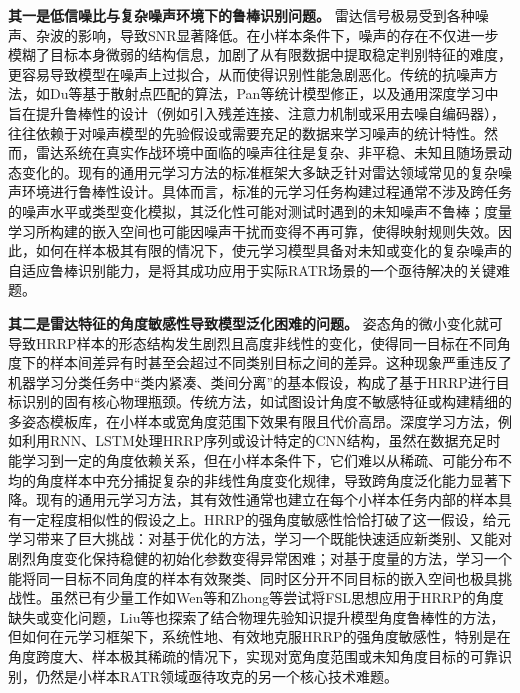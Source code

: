 \textbf{其一是低信噪比与复杂噪声环境下的鲁棒识别问题。}
雷达信号极易受到各种噪声、杂波的影响，导致SNR显著降低。在小样本条件下，噪声的存在不仅进一步模糊了目标本身微弱的结构信息，加剧了从有限数据中提取稳定判别特征的难度，更容易导致模型在噪声上过拟合，从而使得识别性能急剧恶化。传统的抗噪声方法，如Du等基于散射点匹配的算法，Pan等统计模型修正，以及通用深度学习中旨在提升鲁棒性的设计（例如引入残差连接、注意力机制或采用去噪自编码器），往往依赖于对噪声模型的先验假设或需要充足的数据来学习噪声的统计特性。然而，雷达系统在真实作战环境中面临的噪声往往是复杂、非平稳、未知且随场景动态变化的。现有的通用元学习方法的标准框架大多缺乏针对雷达领域常见的复杂噪声环境进行鲁棒性设计。具体而言，标准的元学习任务构建过程通常不涉及跨任务的噪声水平或类型变化模拟，其泛化性可能对测试时遇到的未知噪声不鲁棒；度量学习所构建的嵌入空间也可能因噪声干扰而变得不再可靠，使得映射规则失效。因此，如何在样本极其有限的情况下，使元学习模型具备对未知或变化的复杂噪声的自适应鲁棒识别能力，是将其成功应用于实际RATR场景的一个亟待解决的关键难题。

\textbf{其二是雷达特征的角度敏感性导致模型泛化困难的问题。}
姿态角的微小变化就可导致HRRP样本的形态结构发生剧烈且高度非线性的变化，使得同一目标在不同角度下的样本间差异有时甚至会超过不同类别目标之间的差异。这种现象严重违反了机器学习分类任务中“类内紧凑、类间分离”的基本假设，构成了基于HRRP进行目标识别的固有核心物理瓶颈。传统方法，如试图设计角度不敏感特征或构建精细的多姿态模板库，在小样本或宽角度范围下效果有限且代价高昂。深度学习方法，例如利用RNN、LSTM处理HRRP序列或设计特定的CNN结构，虽然在数据充足时能学习到一定的角度依赖关系，但在小样本条件下，它们难以从稀疏、可能分布不均的角度样本中充分捕捉复杂的非线性角度变化规律，导致跨角度泛化能力显著下降。现有的通用元学习方法，其有效性通常也建立在每个小样本任务内部的样本具有一定程度相似性的假设之上。HRRP的强角度敏感性恰恰打破了这一假设，给元学习带来了巨大挑战：对基于优化的方法，学习一个既能快速适应新类别、又能对剧烈角度变化保持稳健的初始化参数变得异常困难；对基于度量的方法，学习一个能将同一目标不同角度的样本有效聚类、同时区分开不同目标的嵌入空间也极具挑战性。虽然已有少量工作如Wen等和Zhong等尝试将FSL思想应用于HRRP的角度缺失或变化问题，Liu等也探索了结合物理先验知识提升模型角度鲁棒性的方法，但如何在元学习框架下，系统性地、有效地克服HRRP的强角度敏感性，特别是在角度跨度大、样本极其稀疏的情况下，实现对宽角度范围或未知角度目标的可靠识别，仍然是小样本RATR领域亟待攻克的另一个核心技术难题。

